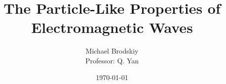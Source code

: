


\title{The Particle-Like Properties of Electromagnetic Waves}
\date{\today}
\author{Michael Brodskiy\\ \small Professor: Q. Yan}



\maketitle

\newpage

\tableofcontents

\newpage

